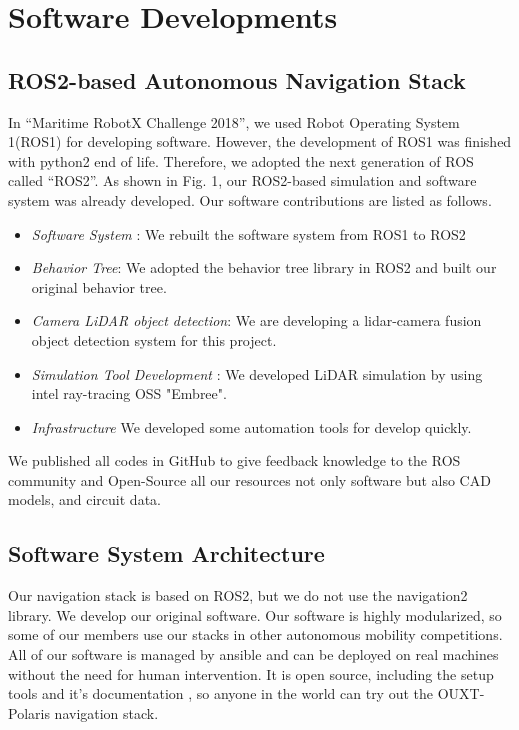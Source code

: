 \documentclass[lettersize,journal]{IEEEtran}
\begin{document}
\section{Software Developments}
\subsection{ROS2-based Autonomous Navigation Stack}
In “Maritime RobotX Challenge 2018”, we used Robot Operating System 1(ROS1) for developing software.
However, the development of ROS1 was finished with python2 end of life.
Therefore, we adopted the next generation of ROS called “ROS2”. \cite{ROS2_paper}
As shown in Fig. 1, our ROS2-based simulation and software system was already developed.
Our software contributions are listed as follows.

\begin{itemize}
  \item {\it Software System }:
    We rebuilt the software system from ROS1 to ROS2
  \item {\it Behavior Tree}:
  We adopted the behavior tree library in ROS2 and built our original behavior tree.  
  \item {\it Camera LiDAR object detection}:
    We are developing a lidar-camera fusion object detection system for this project.
  \item {\it Simulation Tool Development }:
    We developed LiDAR simulation by using intel ray-tracing OSS "Embree".
  \item {\it Infrastructure}
    We developed some automation tools for develop quickly.
\end{itemize}
We published all codes in GitHub to give feedback knowledge to the ROS community and 
Open-Source all our resources not only software \cite{documentation_software}
but also CAD models, and circuit data. \cite{documentation_hardware}

\subsection{Software System Architecture}
Our navigation stack is based on ROS2, but we do not use the navigation2 library. We develop our original software.
Our software is highly modularized, so some of our members use our stacks in other autonomous mobility competitions.
All of our software is managed by ansible and can be deployed on real machines without the need for human intervention.
It is open source, including the setup tools \cite{ouxt_automation} and it's documentation \cite{documentation_software},
so anyone in the world can try out the OUXT-Polaris navigation stack.
\end{document}

